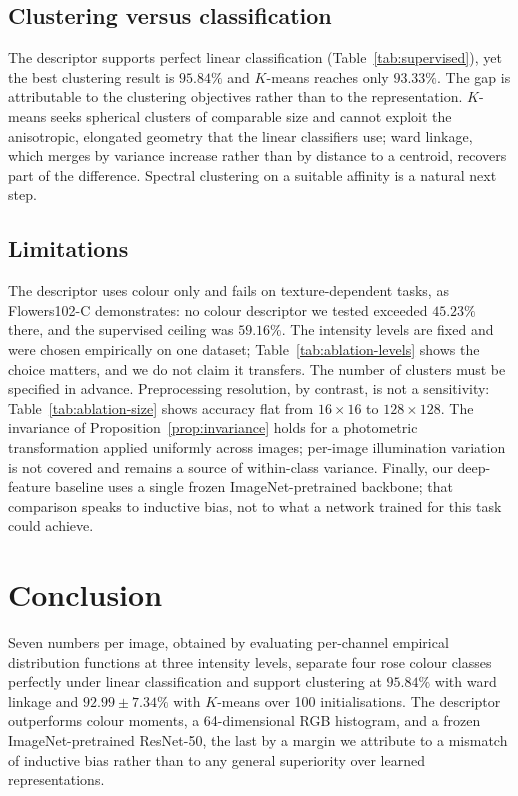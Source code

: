 \documentclass[pdflatex,sn-basic]{sn-jnl}
\theoremstyle{thmstyleone}%
\theoremstyle{thmstyletwo}%
\theoremstyle{thmstylethree}%
\begin{document}
\subsection{Clustering versus classification}\label{sec:gap}

The descriptor supports perfect linear classification
(Table~\ref{tab:supervised}), yet the best clustering result is $95.84\%$ and
$K$-means reaches only $93.33\%$. The gap is attributable to the clustering
objectives rather than to the representation. $K$-means seeks spherical
clusters of comparable size and cannot exploit the anisotropic, elongated
geometry that the linear classifiers use; ward linkage, which merges by
variance increase rather than by distance to a centroid, recovers part of the
difference. Spectral clustering on a suitable affinity is a natural next step.

\subsection{Limitations}\label{sec:limitations}

The descriptor uses colour only and fails on texture-dependent tasks, as
Flowers102-C demonstrates: no colour descriptor we tested exceeded $45.23\%$
there, and the supervised ceiling was $59.16\%$. The intensity levels are fixed and were chosen
empirically on one dataset; Table~\ref{tab:ablation-levels} shows the choice
matters, and we do not claim it transfers. The number of clusters must be
specified in advance. Preprocessing resolution, by contrast, is not a
sensitivity: Table~\ref{tab:ablation-size} shows accuracy flat from
$16\times16$ to $128\times128$. The invariance of Proposition~\ref{prop:invariance} holds
for a photometric transformation applied uniformly across images; per-image
illumination variation is not covered and remains a source of within-class
variance. Finally, our deep-feature baseline uses a single frozen
ImageNet-pretrained backbone; that comparison speaks to inductive bias, not to
what a network trained for this task could achieve.

\section{Conclusion}\label{sec:conclusion}

Seven numbers per image, obtained by evaluating per-channel empirical
distribution functions at three intensity levels, separate four rose colour
classes perfectly under linear classification and support clustering at
$95.84\%$ with ward linkage and $92.99\pm7.34\%$ with $K$-means over 100
initialisations. The descriptor outperforms colour moments, a 64-dimensional
RGB histogram, and a frozen ImageNet-pretrained ResNet-50, the last by a margin
we attribute to a mismatch of inductive bias rather than to any general
superiority over learned representations.
\end{document}
